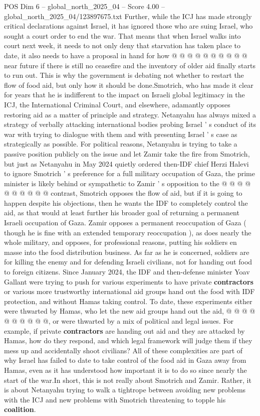 \begin{textsample}{POS Dim 6 – global\_north\_2025\_04 – Score 4.00 – global\_north\_2025\_04/123897675.txt}
Further, while the ICJ has made strongly critical declarations against Israel, it has ignored those who are suing Israel, who sought a court order to end the war.
That means that when Israel walks into court next week, it needs to not only deny that starvation has taken place to date, it also needs to have a proposal in hand for how @ @ @ @ @ @ @ @ @ @ near future if there is still no ceasefire and the inventory of older aid finally starts to run out.
This is why the government is debating not whether to restart the flow of food aid, but only how it should be done.Smotrich, who has made it clear for years that he is indifferent to the impact on Israeli global legitimacy in the ICJ, the International Criminal Court, and elsewhere, adamantly opposes restoring aid as a matter of principle and strategy.
Netanyahu has always mixed a strategy of verbally attacking international bodies probing Israel ' s conduct of its war with trying to dialogue with them and with presenting Israel ' s case as strategically as possible.
For political reasons, Netanyahu is trying to take a passive position publicly on the issue and let Zamir take the fire from Smotrich, but just as Netanyahu in May 2024 quietly ordered then-IDF chief Herzi Halevi to ignore Smotrich ' s preference for a full military occupation of Gaza, the prime minister is likely behind or sympathetic to Zamir ' s opposition to the @ @ @ @ @ @ @ @ @ @ contrast, Smotrich opposes the flow of aid, but if it is going to happen despite his objections, then he wants the IDF to completely control the aid, as that would at least further his broader goal of returning a permanent Israeli occupation of Gaza.
Zamir opposes a permanent reoccupation of Gaza ( though he is fine with an extended temporary reoccupation ), as does nearly the whole military, and opposes, for professional reasons, putting his soldiers en masse into the food distribution business.
As far as he is concerned, soldiers are for killing the enemy and for defending Israeli civilians, not for handing out food to foreign citizens.
Since January 2024, the IDF and then-defense minister Yoav Gallant were trying to push for various experiments to have private \textbf{contractors} or various more trustworthy international aid groups hand out the food with IDF protection, and without Hamas taking control.
To date, these experiments either were thwarted by Hamas, who let the new aid groups hand out the aid, @ @ @ @ @ @ @ @ @ @, or were thwarted by a mix of political and legal issues.
For example, if private \textbf{contractors} are handing out aid and they are attacked by Hamas, how do they respond, and which legal framework will judge them if they mess up and accidentally shoot civilians?
All of these complexities are part of why Israel has failed to date to take control of the food aid in Gaza away from Hamas, even as it has understood how important it is to do so since nearly the start of the war.In short, this is not really about Smotrich and Zamir.
Rather, it is about Netanyahu trying to walk a tightrope between avoiding new problems with the ICJ and new problems with Smotrich threatening to topple his \textbf{coalition}.

\end{textsample}
